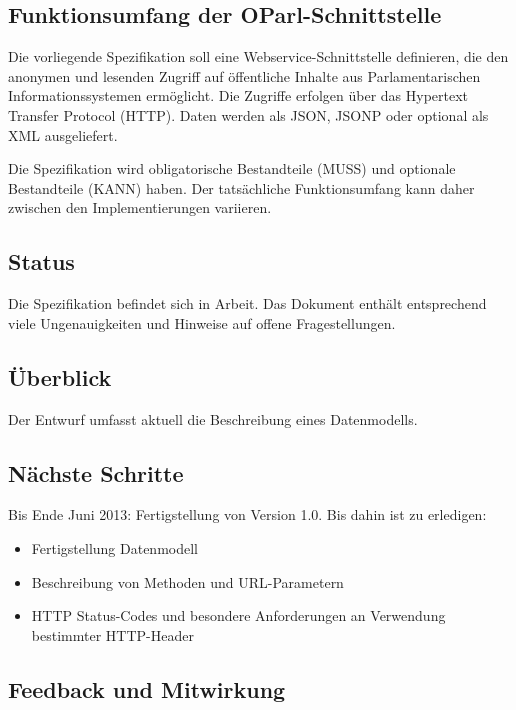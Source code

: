\documentclass[,a4paper]{article}
\begin{document}
\subsection{Funktionsumfang der OParl-Schnittstelle}

Die vorliegende Spezifikation soll eine Webservice-Schnittstelle
definieren, die den anonymen und lesenden Zugriff auf öffentliche
Inhalte aus Parlamentarischen Informationssystemen ermöglicht. Die
Zugriffe erfolgen über das Hypertext Transfer Protocol (HTTP). Daten
werden als JSON, JSONP oder optional als XML ausgeliefert.

Die Spezifikation wird obligatorische Bestandteile (MUSS) und optionale
Bestandteile (KANN) haben. Der tatsächliche Funktionsumfang kann daher
zwischen den Implementierungen variieren.

\subsection{Status}

Die Spezifikation befindet sich in Arbeit. Das Dokument enthält
entsprechend viele Ungenauigkeiten und Hinweise auf offene
Fragestellungen.

\subsection{Überblick}

Der Entwurf umfasst aktuell die Beschreibung eines Datenmodells.

\subsection{Nächste Schritte}

Bis Ende Juni 2013: Fertigstellung von Version 1.0. Bis dahin ist zu
erledigen:

\begin{itemize}
\item
  Fertigstellung Datenmodell
\item
  Beschreibung von Methoden und URL-Parametern
\item
  HTTP Status-Codes und besondere Anforderungen an Verwendung bestimmter
  HTTP-Header
\end{itemize}

\subsection{Feedback und Mitwirkung}
\end{document}
